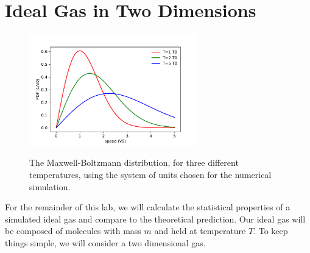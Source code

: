 {\section{Ideal Gas in Two Dimensions}

\begin{figure}[htbp]
\begin{center}
\includegraphics[width=0.65\textwidth]{figs/ideal_gas/mbspeed.pdf} \\
\caption{The Maxwell-Boltzmann distribution, for three different
  temperatures, using the system of units chosen for the numerical
  simulation.}
\label{fig:mbspeed}
\end{center}
\end{figure}

\noindent
For the remainder of this lab, we will calculate the statistical
properties of a simulated ideal gas and compare to the theoretical
prediction.  Our ideal gas will be composed of molecules with mass $m$
and held at temperature $T$.  To keep things simple, we will consider
a two dimensional gas.

}
